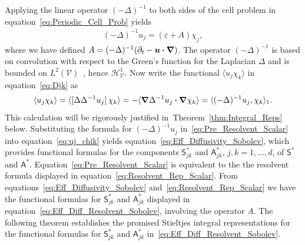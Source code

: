 \documentclass[leqno,onefignum,onetabnum]{siamltex1213}
\newcommand{\thmref}[1]{Theorem~\ref{#1}}
\newcommand{\Vc}{\mathcal{V}}
\newcommand{\Sm}{\mathsf{S}}
\newcommand{\Am}{\mathsf{A}}
\newcommand{\Hs}{\mathscr{H}}
\newcommand\bnabla{\mbox{\boldmath${\nabla}$}}
\providecommand\bcdot{\boldsymbol{\cdot}}
\newcommand{\vecu}{\boldsymbol{u}}
\begin{document}
Applying the linear operator $(-\Delta)^{-1}$ to both sides of the cell
problem in equation~\eqref{eq:Periodic_Cell_Prob} yields
%
\begin{align}\label{eq:Pre_Resolvent_Scalar}
  (-\Delta)^{-1}u_j=(\varepsilon+A)\chi_j,
\end{align}
%
where we have defined $A=(-\Delta)^{-1}(\partial_t-\vecu \bcdot\bnabla)$. The
operator $(-\Delta)^{-1}$ is based on convolution with respect to
the Green's function for the Laplacian $\Delta$ and is bounded on  
$L^2(\Vc)$~\cite{Stakgold:BVP:2000}, hence $\Hs^1_{\Vc}$. Now write
the functional $\langle u_j\chi_k\rangle$ in equation~\eqref{eq:Djk}
as~\cite{Pavliotis:PHD_Thesis}    
%
\begin{align}\label{eq:uj_chik}
  \langle u_j\chi_k\rangle=\langle[\Delta\Delta^{-1}u_j]\,\chi_k\rangle
       =-\langle\bnabla \Delta^{-1}u_j\bcdot\bnabla \chi_k\rangle
       =\langle(-\Delta)^{-1}u_j,\chi_k\rangle_1.
\end{align}
%
This calculation will be rigorously justified
in~\thmref{thm:Integral_Reps} below. Substituting the 
formula for $(-\Delta)^{-1}u_j$ in~\eqref{eq:Pre_Resolvent_Scalar} into
equation~\eqref{eq:uj_chik} yields
equation~\eqref{eq:Eff_Diffusivity_Sobolev}, which provides functional
formulas for the components
$\Sm^*_{jk}$ and $\Am^*_{jk}$, $j,k=1,\ldots,d$, of $\Sm^*$ and $\Am^*$.
Equation~\eqref{eq:Pre_Resolvent_Scalar}   
is equivalent to the the resolvent formula displayed in
equation~\eqref{eq:Resolvent_Rep_Scalar}. 
From equations~\eqref{eq:Eff_Diffusivity_Sobolev}
and~\eqref{eq:Resolvent_Rep_Scalar} we have the functional formulas
for $\Sm^*_{jk}$ and $\Am^*_{jk}$ displayed in
equation~\eqref{eq:Eff_Diff_Resolvent_Sobolev}, involving the
operator $A$.
The following theorem establishes the promised Stieltjes integral
representations for the functional formulas for $\Sm^*_{jk}$ and $\Am^*_{jk}$
in~\eqref{eq:Eff_Diff_Resolvent_Sobolev}.
\end{document}
